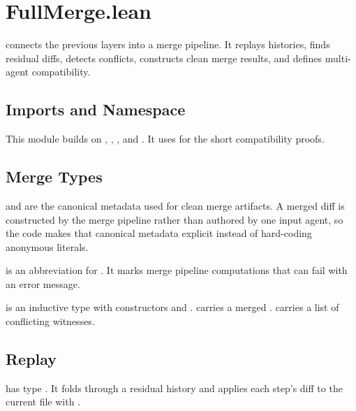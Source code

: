 \section{FullMerge.lean}

 connects the previous layers into a merge pipeline. It
replays histories, finds residual diffs, detects conflicts, constructs clean
merge results, and defines multi-agent compatibility.

\subsection{Imports and Namespace}

This module builds on , ,
, and . It uses
 for the short compatibility proofs.

\subsection{Merge Types}

\begin{definition}
\code{[mergeArtifactAgent]} and \code{[mergeArtifactTimestamp]} are the
canonical metadata used for clean merge artifacts. A merged diff is constructed
by the merge pipeline rather than authored by one input agent, so the code makes
that canonical metadata explicit instead of hard-coding anonymous literals.
\end{definition}

\begin{definition}[MergeM]
\code{[MergeM]} is an abbreviation for . It marks merge
pipeline computations that can fail with an error message.
\end{definition}

\begin{definition}[MergeResult]
\code{[MergeResult]} is an inductive type with constructors
 and .
 carries a merged .  carries a list of
conflicting  witnesses.
\end{definition}

\subsection{Replay}

\begin{definition}[replayFromCommon]
\code{[replayFromCommon]} has type
. It folds through a residual
history and applies each step's diff to the current file with .
\end{definition}

